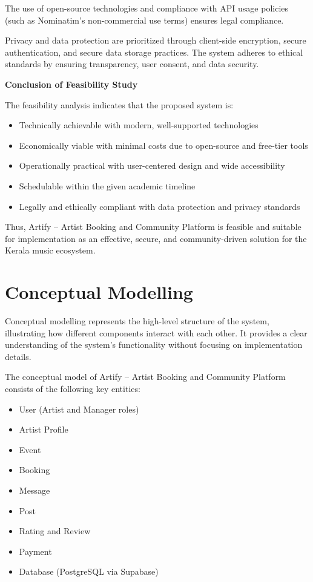 \documentclass[12pt,a4paper]{report}
\begin{document}
The use of open-source technologies and compliance with API usage policies (such as Nominatim's non-commercial use terms) ensures legal compliance.

Privacy and data protection are prioritized through client-side encryption, secure authentication, and secure data storage practices. The system adheres to ethical standards by ensuring transparency, user consent, and data security.

\textbf{Conclusion of Feasibility Study}

The feasibility analysis indicates that the proposed system is:
\begin{itemize}
\item Technically achievable with modern, well-supported technologies
\item Economically viable with minimal costs due to open-source and free-tier tools
\item Operationally practical with user-centered design and wide accessibility
\item Schedulable within the given academic timeline
\item Legally and ethically compliant with data protection and privacy standards
\end{itemize}

Thus, Artify -- Artist Booking and Community Platform is feasible and suitable for implementation as an effective, secure, and community-driven solution for the Kerala music ecosystem.

\section{Conceptual Modelling}
Conceptual modelling represents the high-level structure of the system, illustrating how different components interact with each other. It provides a clear understanding of the system's functionality without focusing on implementation details.

The conceptual model of Artify -- Artist Booking and Community Platform consists of the following key entities:

\begin{itemize}
\item User (Artist and Manager roles)
\item Artist Profile
\item Event
\item Booking
\item Message
\item Post
\item Rating and Review
\item Payment
\item Database (PostgreSQL via Supabase)
\end{itemize}
\end{document}
